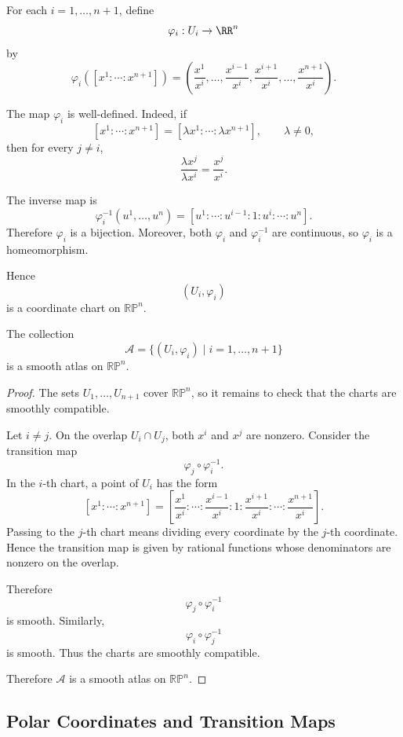 \begin{definition}
For each $i = 1,\dots,n+1$, define
\[
  \varphi_i : U_i \to \RR^n
\]
by
\[
  \varphi_i\left([x^1 : \cdots : x^{n+1}]\right)
  =
  \left(
    \frac{x^1}{x^i},
    \dots,
    \frac{x^{i-1}}{x^i},
    \frac{x^{i+1}}{x^i},
    \dots,
    \frac{x^{n+1}}{x^i}
  \right).
\]
\end{definition}

The map $\varphi_i$ is well-defined. Indeed, if
\[
  [x^1 : \cdots : x^{n+1}]
  =
  [\lambda x^1 : \cdots : \lambda x^{n+1}],
  \qquad \lambda \neq 0,
\]
then for every $j \neq i$,
\[
  \frac{\lambda x^j}{\lambda x^i}
  =
  \frac{x^j}{x^i}.
\]

The inverse map is
\[
  \varphi_i^{-1}(u^1,\dots,u^n)
  =
  [u^1 : \cdots : u^{i-1} : 1 : u^i : \cdots : u^n].
\]
Therefore $\varphi_i$ is a bijection. Moreover, both $\varphi_i$ and
$\varphi_i^{-1}$ are continuous, so $\varphi_i$ is a homeomorphism.

Hence
\[
  (U_i,\varphi_i)
\]
is a coordinate chart on $\mathbb{RP}^n$.

\begin{theorem}
The collection
\[
  \mathcal A
  =
  \{(U_i,\varphi_i) \mid i = 1,\dots,n+1\}
\]
is a smooth atlas on $\mathbb{RP}^n$.
\end{theorem}

\begin{proof}
The sets $U_1,\dots,U_{n+1}$ cover $\mathbb{RP}^n$, so it remains to check that the charts are smoothly compatible.

Let $i \neq j$. On the overlap $U_i \cap U_j$, both $x^i$ and $x^j$ are nonzero. Consider the transition map
\[
  \varphi_j \circ \varphi_i^{-1}.
\]
In the $i$-th chart, a point of $U_i$ has the form
\[
  [x^1 : \cdots : x^{n+1}]
  =
  \left[
    \frac{x^1}{x^i}
    :
    \cdots
    :
    \frac{x^{i-1}}{x^i}
    :
    1
    :
    \frac{x^{i+1}}{x^i}
    :
    \cdots
    :
    \frac{x^{n+1}}{x^i}
  \right].
\]
Passing to the $j$-th chart means dividing every coordinate by the $j$-th coordinate. Hence the transition map is given by rational functions whose denominators are nonzero on the overlap.

Therefore
\[
  \varphi_j \circ \varphi_i^{-1}
\]
is smooth. Similarly,
\[
  \varphi_i \circ \varphi_j^{-1}
\]
is smooth. Thus the charts are smoothly compatible.

Therefore $\mathcal A$ is a smooth atlas on $\mathbb{RP}^n$.
\end{proof}


\subsection{Polar Coordinates and Transition Maps}

